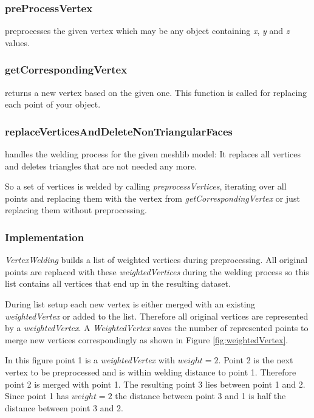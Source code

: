 \documentclass[../ClassicThesis.tex]{subfiles}
\begin{document}
\subsubsection*{preProcessVertex}

preprocesses the given vertex which may be any object containing \emph{x}, \emph{y} and \emph{z} values.

\subsubsection*{getCorrespondingVertex}

returns a new vertex based on the given one. This function is called for replacing each point of your object.

\subsubsection*{replaceVerticesAndDeleteNonTriangularFaces}

handles the welding process for the given meshlib model: It replaces all vertices and deletes triangles that are not needed any more.


So a set of vertices is welded by calling \emph{preprocessVertices}, iterating over all points and replacing them with the vertex from \emph{getCorrespondingVertex} or just replacing them without preprocessing.


\subsubsection{Implementation}

\emph{VertexWelding} builds a list of weighted vertices during preprocessing. All original points are replaced with these \emph{weightedVertices} during the welding process so this list contains all vertices that end up in the resulting dataset.

During list setup each new vertex is either merged with an existing \emph{weightedVertex} or added to the list. Therefore all original vertices are represented by a \emph{weightedVertex}. A \emph{WeightedVertex} saves the number of represented points to merge new vertices correspondingly as shown in Figure \ref{fig:weightedVertex}.

In this figure point 1 is a \emph{weightedVertex} with $weight = 2 $. Point 2 is the next vertex to be preprocessed and is within welding distance to point 1. Therefore point 2 is merged with point 1. The resulting point 3 lies between point 1 and 2. Since point 1 has $ weight = 2 $ the distance between point 3 and 1 is half the distance between point 3 and 2. 
\end{document}
